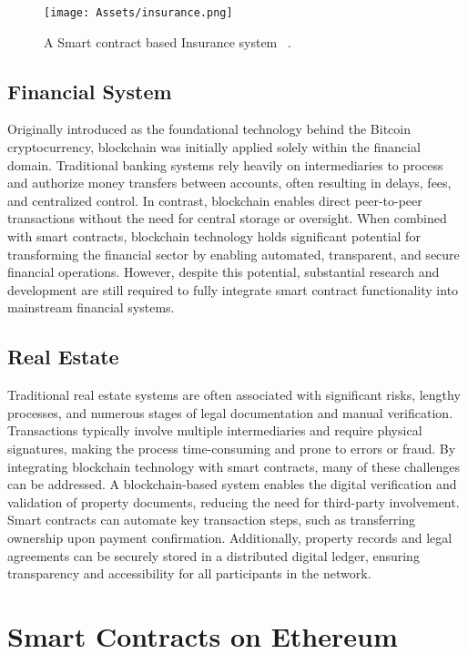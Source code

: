 \begin{figure}[H]
    \centering
    \texttt{[image: Assets/insurance.png]}
    \caption{A Smart contract based Insurance system ~\cite{zhang2020scvd}.}
    \label{fig:insurance}
\end{figure}

\subsection{Financial System}
Originally introduced as the foundational technology behind the Bitcoin cryptocurrency, blockchain was initially applied solely within the financial domain. Traditional banking systems rely heavily on intermediaries to process and authorize money transfers between accounts, often resulting in delays, fees, and centralized control. In contrast, blockchain enables direct peer-to-peer transactions without the need for central storage or oversight. When combined with smart contracts, blockchain technology holds significant potential for transforming the financial sector by enabling automated, transparent, and secure financial operations. However, despite this potential, substantial research and development are still required to fully integrate smart contract functionality into mainstream financial systems.

\subsection{Real Estate}
Traditional real estate systems are often associated with significant risks, lengthy processes, and numerous stages of legal documentation and manual verification. Transactions typically involve multiple intermediaries and require physical signatures, making the process time-consuming and prone to errors or fraud. By integrating blockchain technology with smart contracts, many of these challenges can be addressed. A blockchain-based system enables the digital verification and validation of property documents, reducing the need for third-party involvement. Smart contracts can automate key transaction steps, such as transferring ownership upon payment confirmation. Additionally, property records and legal agreements can be securely stored in a distributed digital ledger, ensuring transparency and accessibility for all participants in the network.


\section{Smart Contracts on Ethereum}
